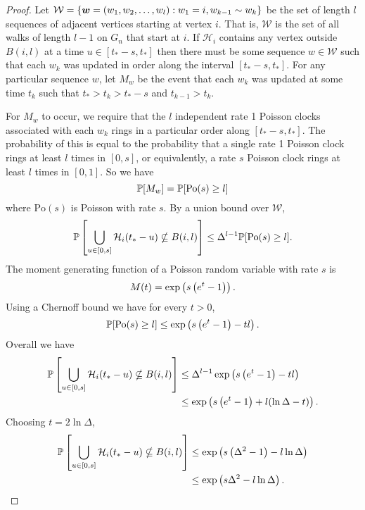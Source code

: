 	\begin{proof}
		Let $\mathcal{W} = \{{\bm{{w}}} = (w_1, w_2, \dots, w_l) : w_1 = i, w_{k-1} \sim w_k\}$ be the set of length $l$ sequences of adjacent vertices starting at vertex $i$. That is, $\mathcal{W}$ is the set of all walks of length $l-1$ on $G_n$ that start at $i$. If $\mathcal{H}_i$ contains any vertex outside $B(i, l)$ at a time $u \in [t_* - s, t_*]$ then there must be some sequence $w \in \mathcal{W}$ such that each $w_k$ was updated in order along the interval $[t_* - s, t_*]$. For any particular sequence $w$, let $M_w$ be the event that each $w_k$ was updated at some time $t_k$ such that $t_* > t_k > t_* - s$ and $t_{k-1} > t_k$. 

		For $M_w$ to occur, we require that the $l$ independent rate 1 Poisson clocks associated with each $w_k$ rings in a particular order along $[t_* - s, t_*]$. The probability of this is equal to the probability that a single rate 1 Poisson clock rings at least $l$ times in $[0, s]$, or equivalently, a rate $s$ Poisson clock rings at least $l$ times in $[0, 1]$. So we have
		\begin{equation}
			\mathbb{P}[M_w] = \mathbb{P}[\mathrm{Po}(s) \geq l]
		\end{equation}
		where $\mathrm{Po}(s)$ is Poisson with rate $s$. By a union bound over $\mathcal{W}$,
		\begin{equation}
			\mathbb{P}\left[\bigcup_{u \in [0, s]}\mathcal{H}_i(t_* - u) \nsubseteq B(i, l)\right] \leq \Delta^{l-1} \mathbb{P}[\mathrm{Po}(s) \geq l].
		\end{equation}
		The moment generating function of a Poisson random variable with rate $s$ is
		\begin{equation}
			M(t) = \exp\left(s\left(e^t - 1\right)\right).
		\end{equation}
		Using a Chernoff bound we have for every $t > 0$,
		\begin{equation}
			\mathbb{P}[\mathrm{Po}(s) \geq l] \leq \exp\left(s\left(e^t - 1\right) - t l\right).
		\end{equation}
		Overall we have
		\begin{align}
			\mathbb{P}\left[\bigcup_{u \in [0, s]}\mathcal{H}_i(t_* - u) \nsubseteq B(i, l)\right] &\leq \Delta^{l-1} \exp\left(s\left(e^t - 1\right) - t l\right)\\
			&\leq \exp\left(s\left(e^t - 1\right) + l (\ln \Delta - t) \right).
		\end{align}
		Choosing $t = 2 \ln \Delta$,
		\begin{align}
			\mathbb{P}\left[\bigcup_{u \in [0, s]}\mathcal{H}_i(t_* - u) \nsubseteq B(i, l)\right] &\leq \exp\left(s\left(\Delta^2 - 1\right) - l \ln \Delta \right)\\
			&\leq \exp\left(s \Delta^2 - l \ln \Delta \right).
		\end{align}
	\end{proof}

